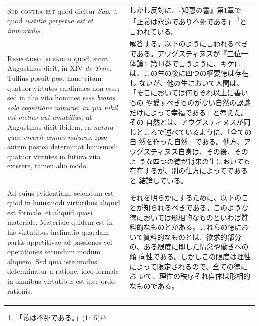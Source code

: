 \documentclass[paper=a4paper,fontsize=10pt,jafontsize=9pt,titlepage]{jlreq}
\begin{document}
\begin{longtable}{p{21em}p{21em}}
\\





 {\scshape Sed contra est} quod dicitur {\itshape Sap}.~{\scshape i},
 quod {\itshape iustitia perpetua est et immortalis}.
 
&

 しかし反対に、『知恵の書』第1章で「正義は永遠であり不死である」
 \footnote{「義は不死である。」(1:15)}と言われている。

\\

 {\scshape Respondeo dicendum} quod, sicut Augustinus dicit, in XIV
 {\itshape de Trin}., Tullius posuit post hanc vitam quatuor virtutes
 cardinales non esse; sed in alia vita homines {\itshape esse beatos
 sola cognitione naturae, in qua nihil est melius aut amabilius}, ut
 Augustinus dicit ibidem, ea {\itshape natura quae creavit omnes
 naturas}. Ipse autem postea determinat huiusmodi quatuor virtutes in
 futura vita existere, tamen alio modo.
 
&

 解答する。以下のように言われるべきである。アウグスティヌスが『三位一
 体論』第14巻で言うように、キケロは、この生の後に四つの枢要徳は存在し
 ないが、他の生において人間は、「そこにおいては何もそれ以上に善いもの
 や愛すべきものがない自然の認識だけによって幸福である」と考えた。その
 自然とは、アウグスティヌスが同じところで述べているように、「全ての自
 然を作った自然」である。他方、アウグスティヌス自身は、その後、そのよ
 うな四つの徳が将来の生においても存在するが、別の仕方によってであると
 結論している。

\\

 Ad cuius evidentiam, sciendum est quod in huiusmodi virtutibus
 aliquid est formale; et aliquid quasi materiale. Materiale quidem est
 in his virtutibus inclinatio quaedam partis appetitivae ad passiones
 vel operationes secundum modum aliquem. Sed quia iste modus
 determinatur a ratione, ideo formale in omnibus virtutibus est ipse
 ordo rationis.
 
&

 それを明らかにするために、以下のことが知られるべきである。このような
 徳においては形相的なものといわば質料的なものとがある。これらの徳にお
 いて質料的なものとは、欲求的部分の、ある限度に即した情念や働きへの傾
 向性である。しかしこの限度は理性によって限定されるので、全ての徳にお
 いて、理性の秩序それ自体は形相的なものである。

\\


\end{longtable}
\end{document}
